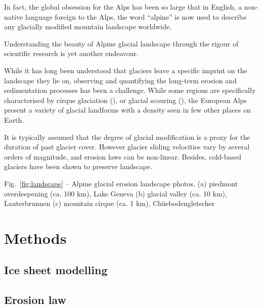 \documentclass[utf8]{article}
\begin{document}
    In fact, the global obsession for the Alps has been so large that in
    English, a non-native language foreign to the Alps, the word “alpine” is
    now used to describe any glacially modified mountain landscape worldwide.

    Understanding the beauty of Alpine glacial landscape through the rigour of
    scientific research is yet another endeavour.

    While it has long been understood that glaciers leave a specific imprint on
    the landscape they lie on, observing and quantifying the long-term erosion
    and sedimentation processes has been a challenge. While some regions are
    specifically characterised by cirque glaciation (), or glacial scouring (),
    the European Alps present a variety of glacial landforms with a density
    seen in few other places on Earth.

    It is typically assumed that the degree of glacial modification is a proxy
    for the duration of past glacier cover. However glacier sliding velocities
    vary by several orders of magnitude, and erosion laws can be non-linear.
    Besides, cold-based glaciers have been shown to preserve landscape.

    Fig.~\ref{fig:landscape} -- Alpine glacial erosion landscape photos.
        (a) piedmont overdeepening (ca. 100 km), Lake Geneva
        (b) glacial valley (ca. 10 km), Lauterbrunnen
        (c) mountain cirque (ca. 1 km), Chüebodengletscher

\section{Methods}

\subsection{Ice sheet modelling}

\subsection{Erosion law}
\end{document}

